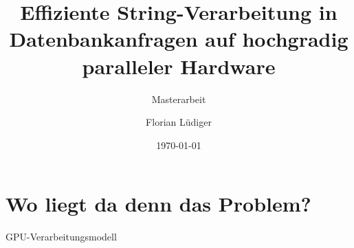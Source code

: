 \documentclass{beamer}
\title{Effiziente String-Verarbeitung in Datenbankanfragen auf hochgradig paralleler Hardware}
\subtitle{Masterarbeit}
\date{\today}
\author{Florian Lüdiger}
\institute{Fakultät Informatik - Lehrstuhl 6 - TU Dortmund}
\begin{document}
	\maketitle
	
	\section{Wo liegt da denn das Problem?}
	\begin{frame}{GPU-Verarbeitungsmodell}
		
	\end{frame}
\end{document}
